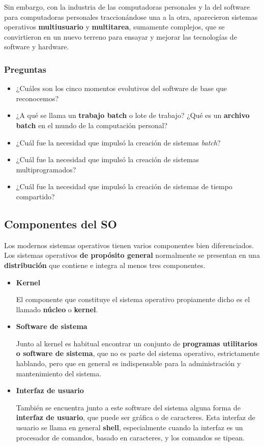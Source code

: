 \documentclass[spanish,a4paper,]{article}
\providecommand{\tightlist}{%
  \setlength{\itemsep}{0pt}\setlength{\parskip}{0pt}}
\begin{document}
Sin embargo, con la industria de las computadoras personales y la del
software para computadoras personales traccionándose una a la otra,
aparecieron sistemas operativos \textbf{multiusuario} y
\textbf{multitarea}, sumamente complejos, que se convirtieron en un
nuevo terreno para ensayar y mejorar las tecnologías de software y
hardware.

\hypertarget{preguntas}{%
\subsubsection{Preguntas}\label{preguntas}}

\begin{itemize}
\tightlist
\item
  ¿Cuáles son los cinco momentos evolutivos del software de base que
  reconocemos?
\item
  ¿A qué se llama un \textbf{trabajo batch} o lote de trabajo? ¿Qué es
  un \textbf{archivo batch} en el mundo de la computación personal?
\item
  ¿Cuál fue la necesidad que impulsó la creación de sistemas
  \emph{batch}?
\item
  ¿Cuál fue la necesidad que impulsó la creación de sistemas
  multiprogramados?
\item
  ¿Cuál fue la necesidad que impulsó la creación de sistemas de tiempo
  compartido?
\end{itemize}

\hypertarget{componentes-del-so}{%
\subsection{Componentes del SO}\label{componentes-del-so}}

Los modernos sistemas operativos tienen varios componentes bien
diferenciados. Los sistemas operativos \textbf{de propósito general}
normalmente se presentan en una \textbf{distribución} que contiene e
integra al menos tres componentes.

\begin{itemize}
\item
  \textbf{Kernel}

  El componente que constituye el sistema operativo propiamente dicho es
  el llamado \textbf{núcleo} o \textbf{kernel}.
\item
  \textbf{Software de sistema}

  Junto al kernel es habitual encontrar un conjunto de \textbf{programas
  utilitarios o software de sistema}, que no es parte del sistema
  operativo, estrictamente hablando, pero que en general es
  indispensable para la administración y mantenimiento del sistema.
\item
  \textbf{Interfaz de usuario}

  También se encuentra junto a este software del sistema alguna forma de
  \textbf{interfaz de usuario}, que puede ser gráfica o de caracteres.
  Esta interfaz de usuario se llama en general \textbf{shell},
  especialmente cuando la interfaz es un procesador de comandos, basado
  en caracteres, y los comandos se tipean.
\end{itemize}
\end{document}

